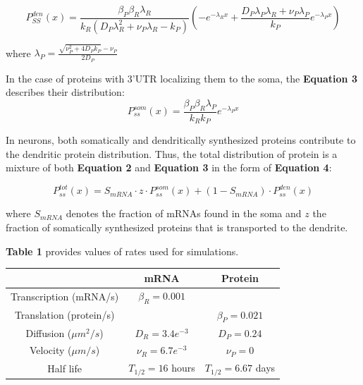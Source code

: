 \begin{equation}
  P^{den}_{SS}(x) = \frac{\beta_{P}\beta_{R}\lambda_{R}}{k_{R}(D_{P}\lambda^{2}_{R}+\nu_{P}\lambda_{R} - k_{P})}(-e^{-\lambda_{R}x} + \frac{D_{P}\lambda_{P}\lambda_{R} + \nu_{P}\lambda_{P}}{k_{P}}e^{-\lambda_{P}x})
\end{equation}

where $\lambda_{P} = \frac{\sqrt{\nu^{2}_{P} + 4D_{P}k_{P}}-\nu_{P}}{2D_{P}}$

In the case of proteins with 3'UTR localizing them to the soma, the \textbf{Equation 3} describes their distribution:
\begin{equation}
  P^{som}_{ss}(x) = \frac{\beta_{P}\beta_{R}\lambda_{P}}{k_{R}k_{P}} e^{-\lambda_{P}x}
\end{equation}


In neurons, both somatically and dendritically synthesized proteins contribute to the dendritic protein distribution. Thus, the total distribution of protein is a mixture of both \textbf{Equation 2} and \textbf{Equation 3} in the form of \textbf{Equation 4}:

\begin{equation}
  P^{tot}_{ss}(x) = S_{mRNA} \cdot z \cdot P^{som}_{ss}(x) + (1-S_{mRNA})  \cdot P^{den}_{ss}(x)
\end{equation}

where $S_{mRNA}$ denotes the fraction of mRNAs found in the soma and $z$ the fraction of somatically synthesized proteins that is transported to the dendrite.


\textbf{Table 1} provides values of rates used for simulations.

\begin{center}
  \begin{tabular}{|c|c|c|}
    \hline
    & mRNA & Protein \\
    \hline
    Transcription (mRNA/s) & $\beta_{R} = 0.001$ & \\
    \hline
    Translation (protein/s) & & $\beta_{P} = 0.021$ \\
    \hline
    Diffusion ($\mu m^{2}/s$) & $D_{R}=3.4e^{-3}$ & $D_{P}=0.24$ \\
    \hline
    Velocity ($\mu m/s$) & $\nu_{R}=6.7e^{-3}$ & $\nu_{P}=0$ \\
    \hline
    Half life & $T_{1/2}=16$ hours & $T_{1/2}=6.67$ days \\
    \hline
  \end{tabular}
\end{center}

